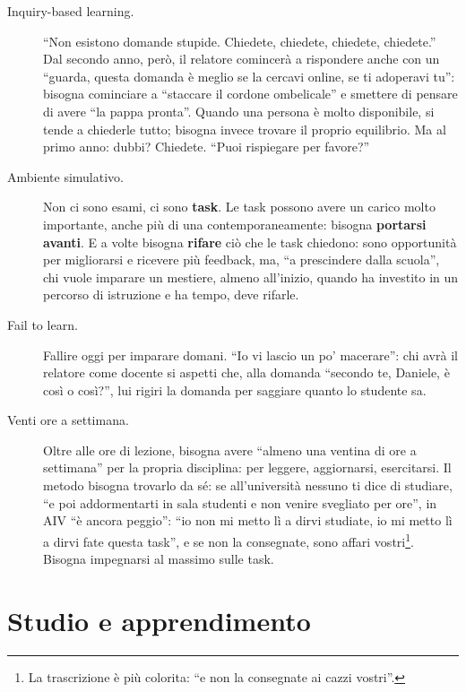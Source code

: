\begin{description}
  \item[Inquiry-based learning.] ``Non esistono domande stupide. Chiedete,
        chiedete, chiedete, chiedete.'' Dal secondo anno, però, il relatore
        comincerà a rispondere anche con un ``guarda, questa domanda è
        meglio se la cercavi online, se ti adoperavi tu'': bisogna
        cominciare a ``staccare il cordone ombelicale'' e smettere di
        pensare di avere ``la pappa pronta''. Quando una persona è molto
        disponibile, si tende a chiederle tutto; bisogna invece trovare il
        proprio equilibrio. Ma al primo anno: dubbi? Chiedete. ``Puoi
        rispiegare per favore?''
  \item[Ambiente simulativo.] Non ci sono esami, ci sono \textbf{task}. Le
        task possono avere un carico molto importante, anche più di una
        contemporaneamente: bisogna \textbf{portarsi avanti}. E a volte
        bisogna \textbf{rifare} ciò che le task chiedono: sono opportunità
        per migliorarsi e ricevere più feedback, ma, ``a prescindere dalla
        scuola'', chi vuole imparare un mestiere, almeno all'inizio,
        quando ha investito in un percorso di istruzione e ha tempo, deve
        rifarle.
  \item[Fail to learn.] Fallire oggi per imparare domani. ``Io vi lascio un
        po' macerare'': chi avrà il relatore come docente si aspetti che,
        alla domanda ``secondo te, Daniele, è così o così?'', lui rigiri la
        domanda per saggiare quanto lo studente sa.
  \item[Venti ore a settimana.] Oltre alle ore di lezione, bisogna avere
        ``almeno una ventina di ore a settimana'' per la propria
        disciplina: per leggere, aggiornarsi, esercitarsi. Il metodo
        bisogna trovarlo da sé: se all'università nessuno ti dice di
        studiare, ``e poi addormentarti in sala studenti e non venire
        svegliato per ore'', in AIV ``è ancora peggio'': ``io non mi metto lì
        a dirvi studiate, io mi metto lì a dirvi fate questa task'', e se
        non la consegnate, sono affari vostri\footnote{La trascrizione è
        più colorita: ``e non la consegnate ai cazzi vostri''.}. Bisogna
        impegnarsi al massimo sulle task.
\end{description}

\section{Studio e apprendimento}
\label{p0:sec:studio}

